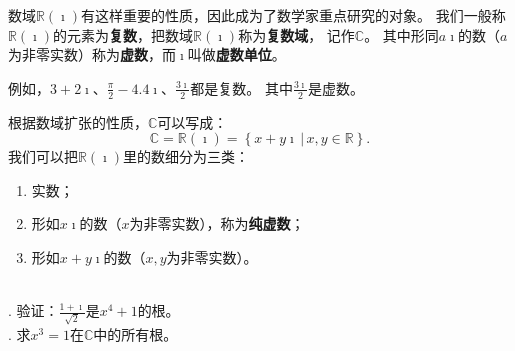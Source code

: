 \documentclass[12pt,UTF8]{ctexbook}
\begin{document}
数域$\mathbb{R}(\imath)$有这样重要的性质，因此成为了数学家重点研究的对象。
我们一般称$\mathbb{R}(\imath)$的元素为\textbf{复数}，把数域$\mathbb{R}(\imath)$称为\textbf{复数域}，
记作$\mathbb{C}$。
其中形同$a\imath$的数（$a$为非零实数）称为\textbf{虚数}，而$\imath$叫做\textbf{虚数单位}。

例如，$3 + 2\imath$、$\displaystyle\frac{\pi}{2} - 4.4\imath$、$\displaystyle\frac{3\imath}{2}$都是复数。
其中$\displaystyle\frac{3\imath}{2}$是虚数。

根据数域扩张的性质，$\mathbb{C}$可以写成：
$$\mathbb{C} = \mathbb{R}(\imath) = \left\{\left. x + y\imath \, \right| \, x, y \in \mathbb{R} \right\}. $$
我们可以把$\mathbb{R}(\imath)$里的数细分为三类：
\begin{enumerate}
    \item 实数；
    \item 形如$x\imath$的数（$x$为非零实数），称为\textbf{纯虚数}；
    \item 形如$x + y\imath$的数（$x, y$为非零实数）。
\end{enumerate}

\begin{et}
    \mbox{} \\
    . 验证：$\displaystyle\frac{1 + \imath}{\sqrt{2}}$是$x^4 + 1$的根。\\
    . 求$x^3 = 1$在$\mathbb{C}$中的所有根。
    
\end{et}
\end{document}
